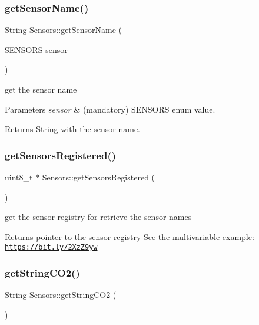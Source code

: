 \subsubsection{\texorpdfstring{get\+Sensor\+Name()}{getSensorName()}}
{\footnotesize\ttfamily String Sensors\+::get\+Sensor\+Name (\begin{DoxyParamCaption}\item[{S\+E\+N\+S\+O\+RS}]{sensor }\end{DoxyParamCaption})}



get the sensor name 


\begin{DoxyParams}{Parameters}
{\em sensor} & (mandatory) S\+E\+N\+S\+O\+RS enum value. \\
\hline
\end{DoxyParams}
\begin{DoxyReturn}{Returns}
String with the sensor name. 
\end{DoxyReturn}
\mbox{\label{classSensors_af9ee8f89e81d76a4c2b41ed6dc38f2f3}} 
\subsubsection{\texorpdfstring{get\+Sensors\+Registered()}{getSensorsRegistered()}}
{\footnotesize\ttfamily uint8\+\_\+t $\ast$ Sensors\+::get\+Sensors\+Registered (\begin{DoxyParamCaption}{ }\end{DoxyParamCaption})}



get the sensor registry for retrieve the sensor names 

\begin{DoxyReturn}{Returns}
pointer to the sensor registry \hyperlink{}{See the multivariable example\+: \href{https://bit.ly/2XzZ9yw}{\tt https\+://bit.\+ly/2\+Xz\+Z9yw} }
\end{DoxyReturn}
\mbox{\label{classSensors_a64c1c667d899309fdbc08e88b8e9f2fc}} 
\subsubsection{\texorpdfstring{get\+String\+C\+O2()}{getStringCO2()}}
{\footnotesize\ttfamily String Sensors\+::get\+String\+C\+O2 (\begin{DoxyParamCaption}{ }\end{DoxyParamCaption})}

